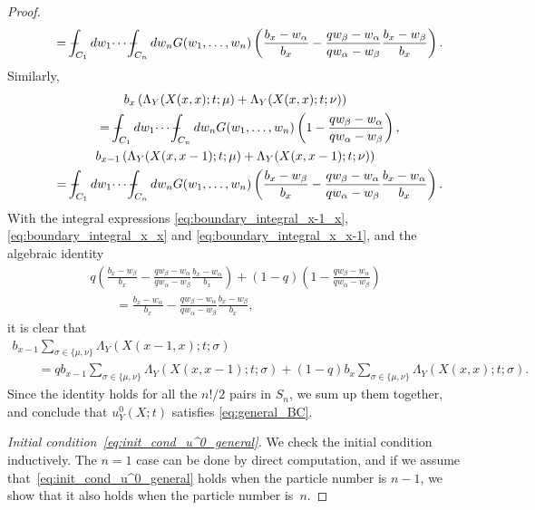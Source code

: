\documentclass[11pt]{article}
\numberwithin{equation}{section}
\def\Xint#1{\mathchoice
{\XXint\displaystyle\textstyle{#1}}%
{\XXint\textstyle\scriptstyle{#1}}%
{\XXint\scriptstyle\scriptscriptstyle{#1}}%
{\XXint\scriptscriptstyle\scriptscriptstyle{#1}}%
\!\int}
\def\XXint#1#2#3{{\setbox0=\hbox{$#1{#2#3}{\int}$}
\vcenter{\hbox{$#2#3$}}\kern-.5\wd0}}
\def\dashint{\Xint-}
\begin{document}
\begin{proof}
\begin{gather}
 \qquad {}=   \dashint_{C_1} dw_1 \dotsi \dashint_{C_n} dw_n G(w_1, \dotsc, w_n) \left( \frac{b_x - w_{\alpha}}{b_x} - \frac{qw_{\beta} - w_{\alpha}}{qw_{\alpha} - w_{\beta}} \frac{b_x - w_{\beta}}{b_x} \right).
\label{eq:boundary_integral_x-1_x}
 \end{gather}
 Similarly,
 \begin{gather}
 b_x \left( \Lambda_Y(X(x, x); t; \mu) + \Lambda_Y(X(x, x); t; \nu) \right) \nonumber\\
 \qquad{}{} = \dashint_{C_1} dw_1 \dotsi \dashint_{C_n} dw_n G(w_1, \dotsc, w_n) \left( 1 - \frac{qw_{\beta} - w_{\alpha}}{qw_{\alpha} - w_{\beta}} \right), \label{eq:boundary_integral_x_x}
 \\
 b_{x - 1} \left( \Lambda_Y(X(x, x - 1); t; \mu) + \Lambda_Y(X(x, x - 1); t; \nu) \right) \nonumber\\
 \qquad{} = \dashint_{C_1} dw_1 \dotsi \dashint_{C_n} dw_n G(w_1, \dotsc, w_n)
  \left( \frac{b_x - w_{\beta}}{b_x} - \frac{qw_{\beta} - w_{\alpha}}{qw_{\alpha} - w_{\beta}} \frac{b_x - w_{\alpha}}{b_x} \right).\label{eq:boundary_integral_x_x-1}
 \end{gather}
 With the integral expressions \eqref{eq:boundary_integral_x-1_x}, \eqref{eq:boundary_integral_x_x} and \eqref{eq:boundary_integral_x_x-1}, and the algebraic identity
 \begin{gather*}
 q \left( \frac{b_x - w_{\beta}}{b_x} - \frac{qw_{\beta} - w_{\alpha}}{qw_{\alpha} - w_{\beta}} \frac{b_x - w_{\alpha}}{b_x} \right) + (1 - q) \left( 1 - \frac{qw_{\beta} - w_{\alpha}}{qw_{\alpha} - w_{\beta}} \right) \\
 \qquad{} = \frac{b_x - w_{\alpha}}{b_x} - \frac{qw_{\beta} - w_{\alpha}}{qw_{\alpha} - w_{\beta}} \frac{b_x - w_{\beta}}{b_x},
 \end{gather*}
 it is clear that
 \begin{gather*}
 b_{x - 1} \sum_{\sigma \in \{ \mu, \nu \}} \Lambda_Y(X(x - 1, x); t; \sigma)   \\
 \qquad{} = q b_{x - 1} \sum_{\sigma \in \{ \mu, \nu \}} \Lambda_Y(X(x, x - 1); t; \sigma) + (1 - q) b_x \sum_{\sigma \in \{ \mu, \nu \}} \Lambda_Y(X(x, x); t; \sigma).
 \end{gather*}
 Since the identity holds for all the $n!/2$ pairs in $S_n$, we sum up them together, and conclude that $u^0_Y(X; t)$ satisf\/ies \eqref{eq:general_BC}.

\textit{Initial condition~\eqref{eq:init_cond_u^0_general}.}
 We check the initial condition inductively. The $n = 1$ case can be done by direct computation, and if we assume that~\eqref{eq:init_cond_u^0_general} holds when the particle number is $n - 1$, we show that it also holds when the particle number is~$n$.


\end{proof}
\end{document}
